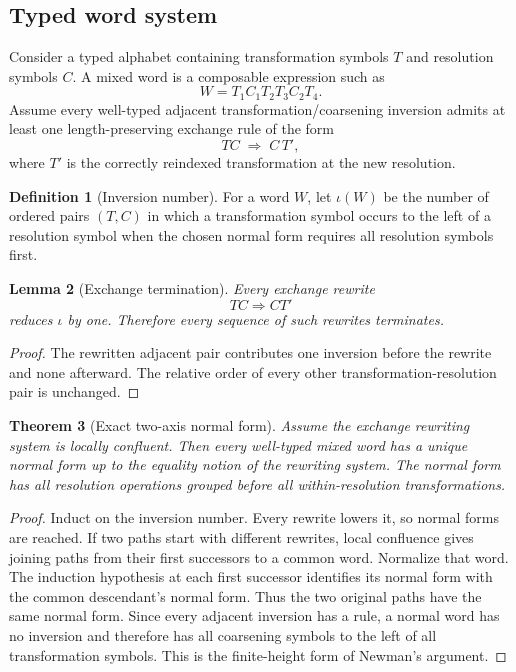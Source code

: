\documentclass[11pt]{article}
\newtheorem{theorem}{Theorem}[section]
\newtheorem{lemma}[theorem]{Lemma}
\theoremstyle{definition}
\newtheorem{definition}[theorem]{Definition}
\theoremstyle{remark}
\begin{document}
\subsection{Typed word system}

Consider a typed alphabet containing transformation symbols $T$ and resolution symbols $C$. A mixed word is a composable expression such as
\[
W=T_1C_1T_2T_3C_2T_4.
\]
Assume every well-typed adjacent transformation/coarsening inversion admits at least one length-preserving exchange rule of the form
\[
TC\;\Rightarrow\;C\,T',
\]
where $T'$ is the correctly reindexed transformation at the new resolution.

\begin{definition}[Inversion number]
For a word $W$, let $\iota(W)$ be the number of ordered pairs $(T,C)$ in which a transformation symbol occurs to the left of a resolution symbol when the chosen normal form requires all resolution symbols first.
\end{definition}

\begin{lemma}[Exchange termination]\label{lem:termination}
Every exchange rewrite
\[
TC\Rightarrow CT'
\]
reduces $\iota$ by one. Therefore every sequence of such rewrites terminates.
\end{lemma}

\begin{proof}
The rewritten adjacent pair contributes one inversion before the rewrite and none afterward. The relative order of every other transformation-resolution pair is unchanged.
\end{proof}

\begin{theorem}[Exact two-axis normal form]\label{thm:normal-form}
Assume the exchange rewriting system is locally confluent. Then every well-typed mixed word has a unique normal form up to the equality notion of the rewriting system. The normal form has all resolution operations grouped before all within-resolution transformations.
\end{theorem}

\begin{proof}
Induct on the inversion number. Every rewrite lowers it, so normal forms are reached. If two paths start with different rewrites, local confluence gives joining paths from their first successors to a common word. Normalize that word. The induction hypothesis at each first successor identifies its normal form with the common descendant's normal form. Thus the two original paths have the same normal form. Since every adjacent inversion has a rule, a normal word has no inversion and therefore has all coarsening symbols to the left of all transformation symbols. This is the finite-height form of Newman's argument.
\end{proof}
\end{document}
